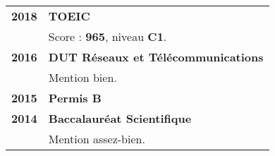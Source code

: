 \begin{supertabular}{rl}
    \textbf{2018} & \textbf{TOEIC}\\
    & Score : \textbf{965}, niveau \textbf{C1}.\\[1.5ex]
    \textbf{2016} & \textbf{DUT R\'eseaux et T\'el\'ecommunications}\\
    & Mention bien.\\[1.5ex]
    \textbf{2015} & \textbf{Permis B}\\[1.5ex]
    \textbf{2014} & \textbf{Baccalaur\'eat Scientifique}\\
    & Mention assez-bien.\\
\end{supertabular}

\medskip
